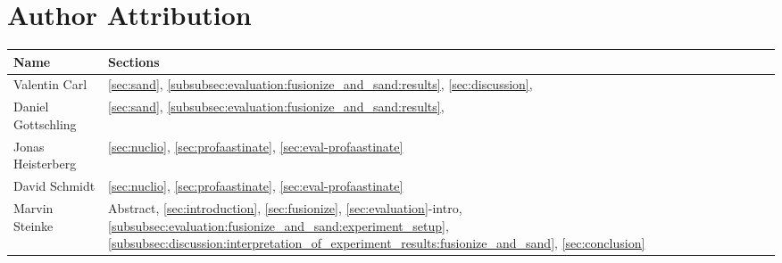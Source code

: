 \documentclass[a4paper, twoside]{IEEEtran}
\begin{document}













\section*{Author Attribution}


\vspace{1em}
\begin{center}
    \begin{tabular}{l l} \toprule
        Name & Sections \\ \midrule
        Valentin Carl &
            \ref{sec:sand},
            \ref{subsubsec:evaluation:fusionize_and_sand:results},
            \ref{sec:discussion},
            \\
        Daniel Gottschling &
            \ref{sec:sand},
            \ref{subsubsec:evaluation:fusionize_and_sand:results},
            \\
        Jonas Heisterberg & 
            \ref{sec:nuclio},
            \ref{sec:profaastinate},
            \ref{sec:eval-profaastinate}
        \\
        David Schmidt & 
        \ref{sec:nuclio},
        \ref{sec:profaastinate},
        \ref{sec:eval-profaastinate}
        \\
        Marvin Steinke & \makecell[l]{
            Abstract,
            \ref{sec:introduction},
            \ref{sec:fusionize},
            \ref{sec:evaluation}-intro, \\
            \ref{subsubsec:evaluation:fusionize_and_sand:experiment_setup},
            \ref{subsubsec:discussion:interpretation_of_experiment_results:fusionize_and_sand},
            \ref{sec:conclusion}
        }\\ \bottomrule
    \end{tabular}
\end{center}
\end{document}
